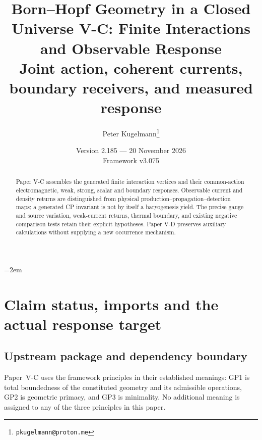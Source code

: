 \documentclass[12pt,a4paper]{article}
\title{\textbf{Born--Hopf Geometry in a Closed Universe V-C: Finite Interactions and Observable Response}\\[0.45em]
\large Joint action, coherent currents, boundary receivers, and measured response}
\author{Peter Kugelmann\thanks{\texttt{pkugelmann@proton.me}}}
\date{Version 2.185 --- 20 November 2026 \\ Framework v3.075}
\begin{document}
\emergencystretch=2em
\maketitle
\begin{abstract}
Paper V-C assembles the generated finite interaction vertices and
their common-action electromagnetic, weak, strong, scalar and boundary
responses. Observable current and density returns are distinguished from
physical production--propagation--detection maps; a generated CP invariant
is not by itself a baryogenesis yield. The precise gauge and source variation,
weak-current returns, thermal boundary, and existing negative comparison
tests retain their explicit hypotheses. Paper V-D preserves auxiliary
calculations without supplying a new occurrence mechanism.
\end{abstract}
\tableofcontents
\clearpage

\section{Claim status, imports and the actual response target}
\label{p5c:sec:organized-scope}
\subsection{Upstream package and dependency boundary}
\label{p7v2:sec:imports}

Paper~V-C uses the framework principles in their established meanings:
GP1 is total boundedness of the constituted geometry and its admissible
operations, GP2 is geometric primacy, and GP3 is minimality.  No additional
meaning is assigned to any of the three principles in this paper.
\end{document}
